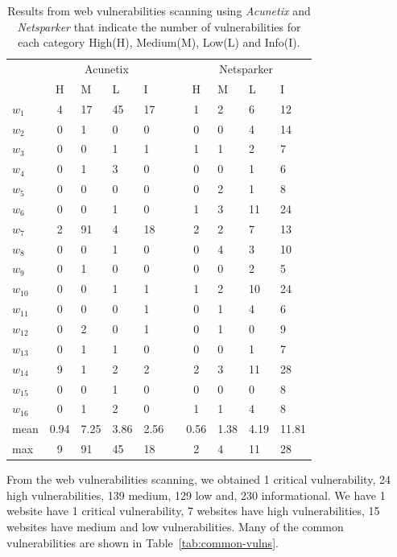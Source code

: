 \documentclass[conference]{IEEEtran}
\begin{document}
\begin{table}[thbp]
		\caption{Results from web vulnerabilities scanning using \emph{Acunetix} and \emph{Netsparker} that indicate the number of vulnerabilities for each category High(H), Medium(M), Low(L) and Info(I).}
	\label{tab:vuln}
	\centering
	\begin{tabular}{lcllllclll}
		& \multicolumn{4}{c}{Acunetix} &  & \multicolumn{4}{c}{Netsparker} \\ \cline{2-5} \cline{7-10} 
		& H & M & L & I &  & H & M & L & I \\ \cline{2-5} \cline{7-10} 
		$w_1$ & 4 & 17 & 45 & 17 &  & 1 & 2 & 6 & 12 \\
		$w_2$ & 0 & 1 & 0 & 0 &  & 0 & 0 & 4 & 14 \\
		$w_3$ & 0 & 0 & 1 & 1 &  & 1 & 1 & 2 & 7 \\
		$w_4$ & 0 & 1 & 3 & 0 &  & 0 & 0 & 1 & 6 \\
		$w_5$ & 0 & 0 & 0 & 0 &  & 0 & 2 & 1 & 8 \\
		$w_6$ & 0 & 0 & 1 & 0 &  & 1 & 3 & 11 & 24 \\
		$w_7$ & 2 & 91 & 4 & 18 &  & 2 & 2 & 7 & 13 \\
		$w_8$ & 0 & 0 & 1 & 0 &  & 0 & 4 & 3 & 10 \\
		$w_9$ & 0 & 1 & 0 & 0 &  & 0 & 0 & 2 & 5 \\
		$w_{10}$ & 0 & 0 & 1 & 1 &  & 1 & 2 & 10 & 24 \\
		$w_{11}$ & 0 & 0 & 0 & 1 &  & 0 & 1 & 4 & 6 \\
		$w_{12}$ & 0 & 2 & 0 & 1 &  & 0 & 1 & 0 & 9 \\
		$w_{13}$ & 0 & 1 & 1 & 0 &  & 0 & 0 & 1 & 7 \\
		$w_{14}$ & 9 & 1 & 2 & 2 &  & 2 & 3 & 11 & 28 \\
		$w_{15}$ & 0 & 0 & 1 & 0 &  & 0 & 0 & 0 & 8 \\
		$w_{16}$ & 0 & 1 & 2 & 0 &  & 1 & 1 & 4 & 8 \\ \cline{2-5} \cline{7-10} 
		mean &0.94 & 7.25 & 3.86 & 2.56 & & 0.56 & 1.38 & 4.19 & 11.81 \\
		max & 9 & 91 & 45 & 18 & & 2 & 4 & 11 & 28 \\ \hline
	\end{tabular}
\end{table}

From the web vulnerabilities scanning, we obtained 1 critical vulnerability, 24 high vulnerabilities, 139 medium, 129 low and, 230 informational. We have 1 website have 1 critical vulnerability, 7 websites have high vulnerabilities, 15 websites have medium and low vulnerabilities. Many of the common vulnerabilities are shown in Table~\ref{tab:common-vulns}.
\end{document}
